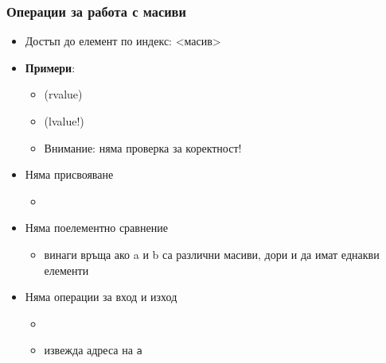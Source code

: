 \documentclass{beamer}
\begin{document}
\begin{frame}
  \frametitle{Операции за работа с масиви}

  \begin{itemize}[<+->]
  \item Достъп до елемент по индекс: <масив>
  \item \textbf{Примери}:
    \begin{itemize}
    \item {} (\alert{rvalue})
    \item {} (\alert{lvalue!})
    \item \alert{Внимание: няма проверка за коректност!}
    \end{itemize}
  \item Няма присвояване
    \begin{itemize}
    \item {}
    \end{itemize}
  \item Няма поелементно сравнение
    \begin{itemize}
    \item {} винаги връща  ако \tta a и \tta b са различни масиви, дори и да имат еднакви елементи
    \end{itemize}
  \item Няма операции за вход и изход
    \begin{itemize}
    \item {}
    \item {} извежда адреса на \tt{a}
    \end{itemize}
  \end{itemize}
\end{frame}
\end{document}
